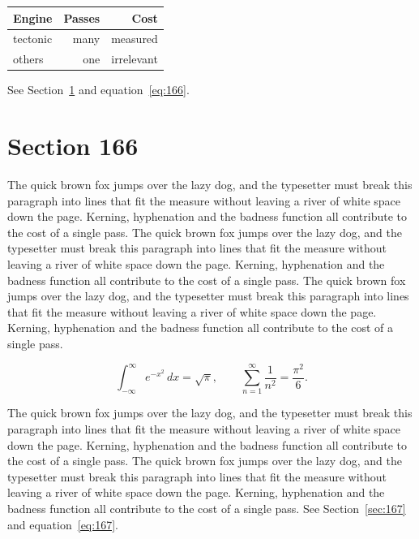 \documentclass{article}
\begin{document}
\begin{center}
\begin{tabular}{lrr}
\toprule
Engine & Passes & Cost \\
\midrule
tectonic & many & measured \\
others & one & irrelevant \\
\bottomrule
\end{tabular}
\end{center}

See Section~\ref{sec:166} and equation~\eqref{eq:166}.
\section{Section 166}
\label{sec:166}
The quick brown fox jumps over the lazy dog, and the typesetter must break this paragraph into lines that fit the measure without leaving a river of white space down the page. Kerning, hyphenation and the badness function all contribute to the cost of a single pass. The quick brown fox jumps over the lazy dog, and the typesetter must break this paragraph into lines that fit the measure without leaving a river of white space down the page. Kerning, hyphenation and the badness function all contribute to the cost of a single pass. The quick brown fox jumps over the lazy dog, and the typesetter must break this paragraph into lines that fit the measure without leaving a river of white space down the page. Kerning, hyphenation and the badness function all contribute to the cost of a single pass. 

\begin{equation}\label{eq:166}
\int_{-\infty}^{\infty} e^{-x^{2}}\,dx = \sqrt{\pi}, \qquad
\sum_{n=1}^{\infty} \frac{1}{n^{2}} = \frac{\pi^{2}}{6}.
\end{equation}

The quick brown fox jumps over the lazy dog, and the typesetter must break this paragraph into lines that fit the measure without leaving a river of white space down the page. Kerning, hyphenation and the badness function all contribute to the cost of a single pass. The quick brown fox jumps over the lazy dog, and the typesetter must break this paragraph into lines that fit the measure without leaving a river of white space down the page. Kerning, hyphenation and the badness function all contribute to the cost of a single pass. 
See Section~\ref{sec:167} and equation~\eqref{eq:167}.
\end{document}

